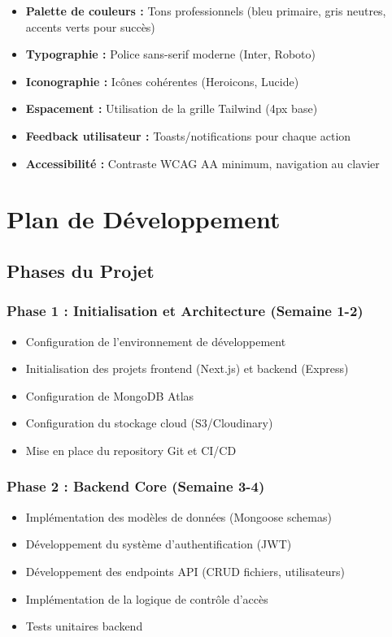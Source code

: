 \documentclass[12pt,a4paper]{article}
\begin{document}
\begin{itemize}[leftmargin=*]
    \item \textbf{Palette de couleurs :} Tons professionnels (bleu primaire, gris neutres, accents verts pour succès)
    \item \textbf{Typographie :} Police sans-serif moderne (Inter, Roboto)
    \item \textbf{Iconographie :} Icônes cohérentes (Heroicons, Lucide)
    \item \textbf{Espacement :} Utilisation de la grille Tailwind (4px base)
    \item \textbf{Feedback utilisateur :} Toasts/notifications pour chaque action
    \item \textbf{Accessibilité :} Contraste WCAG AA minimum, navigation au clavier
\end{itemize}

\section{Plan de Développement}

\subsection{Phases du Projet}

\subsubsection{Phase 1 : Initialisation et Architecture (Semaine 1-2)}

\begin{itemize}[leftmargin=*]
    \item Configuration de l'environnement de développement
    \item Initialisation des projets frontend (Next.js) et backend (Express)
    \item Configuration de MongoDB Atlas
    \item Configuration du stockage cloud (S3/Cloudinary)
    \item Mise en place du repository Git et CI/CD
\end{itemize}

\subsubsection{Phase 2 : Backend Core (Semaine 3-4)}

\begin{itemize}[leftmargin=*]
    \item Implémentation des modèles de données (Mongoose schemas)
    \item Développement du système d'authentification (JWT)
    \item Développement des endpoints API (CRUD fichiers, utilisateurs)
    \item Implémentation de la logique de contrôle d'accès
    \item Tests unitaires backend
\end{itemize}
\end{document}
